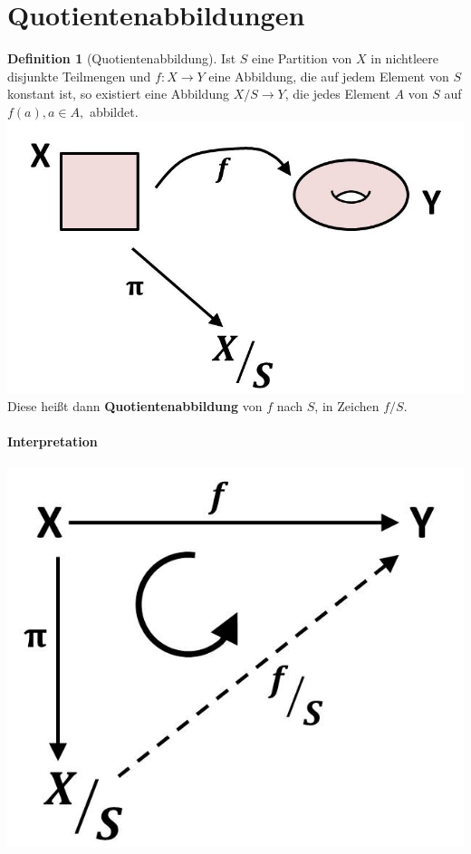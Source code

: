 \documentclass[a4paper,11pt,notitlepage]{report}
\theoremstyle{remark}
\theoremstyle{definition}
\newtheorem{definition}{Definition}[chapter]
\begin{document}
\newpage
\section{Quotientenabbildungen}

\begin{definition}[Quotientenabbildung]
Ist $S$ eine Partition von $X$ in nichtleere disjunkte Teilmengen und $f \colon X \rightarrow Y$ eine Abbildung, die auf jedem Element von $S$ konstant ist, so existiert eine Abbildung $X/S \rightarrow Y$, die jedes Element $A$ von $S$ auf $f(a), a \in A,$ abbildet. \newline
\includegraphics[scale=0.4]{images/Quotientenabbildung.jpg} \newline
Diese heißt dann \textbf{Quotientenabbildung} von $f$ nach $S$, in Zeichen $f/S$.
\end{definition}

\paragraph{Interpretation}
\begin{center}
\includegraphics[scale=0.4]{images/f_modulo_S_Diagramm.jpg}
\end{center}
\end{document}
